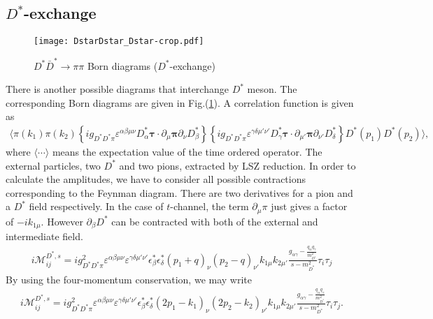 \documentclass[aps,prd,preprintnumbers,showpacs,showkeys,nofootinbib,
superscriptaddress,fleqn,floatfix,tightenlines, 10pt]{revtex4-1}
\begin{document}

\subsection{$D^*$-exchange}
\begin{figure}[H]
	\centering
	\texttt{[image: DstarDstar\_Dstar-crop.pdf]}
	\caption{$D^* \bar{D}^* \rightarrow \pi\pi$ Born diagrams ($D^*$-exchange)}
	\label{fig5}
\end{figure}
There is another possible diagrams that interchange $D^*$ meson.
The corresponding Born diagrams are given in Fig.(\ref{fig5}).
A correlation function is given as
\begin{align}
	\langle \pi(k_1) \pi(k_2) \left\{ i g_{D^*D^*\pi} \varepsilon^{\alpha \beta \mu \nu}
	D_\alpha^* \bm{\tau} \cdot \partial_\mu \bm{\pi} \partial_\nu D_\beta^* \right\}
	\left\{ i g_{D^*D^*\pi} \varepsilon^{\gamma \delta \mu' \nu'} D_\gamma^* \bm{\tau}
	\cdot \partial_{\mu'} \bm{\pi} \partial_{\nu'} D_\delta^* \right\} D^* (p_1) D^* (p_2) \rangle,
\end{align}
where $\langle \cdots \rangle$ means the expectation value of the time ordered operator. The external particles, two $D^*$ and
two pions, extracted by LSZ reduction. In order to calculate the amplitudes, we have to consider all possible contractions
corresponding to the Feynman diagram. There are two derivatives for a pion and a $D^*$ field respectively.
In the case of $t$-channel, the term $\partial_\mu \pi$ just gives a factor of $-ik_{1\mu}$.
However $\partial_\beta D^*$ can be contracted with both of the external and intermediate field.
\begin{align}
	i\mathcal{M}_{ij}^{D^*,s} = i g_{D^*D^*\pi}^2 \varepsilon^{\alpha \beta \mu \nu}
	\varepsilon^{\gamma \delta \mu' \nu'} \epsilon_\beta^* \epsilon_\delta^* (p_1 + q)_\nu
	(p_2 - q)_{\nu'} k_{1\mu} k_{2\mu'} \frac{g_{\alpha \gamma} - \frac{q_\alpha q_\gamma}{m_{D^*}^2}}
	{s - m_{D^*}^2} \tau_i \tau_j
\end{align}
By using the four-momentum conservation, we may write
\begin{align}
	i\mathcal{M}_{ij}^{D^*,s} = i g_{D^*D^*\pi}^2 \varepsilon^{\alpha \beta \mu \nu}
	\varepsilon^{\gamma \delta \mu' \nu'} \epsilon_\beta^* \epsilon_\delta^* (2p_1 - k_1)_\nu
	(2p_2 - k_2)_{\nu'} k_{1\mu} k_{2\mu'} \frac{g_{\alpha \gamma} - \frac{q_\alpha q_\gamma}{m_{D^*}^2}}
	{s - m_{D^*}^2} \tau_i \tau_j .
\end{align}
\end{document}

